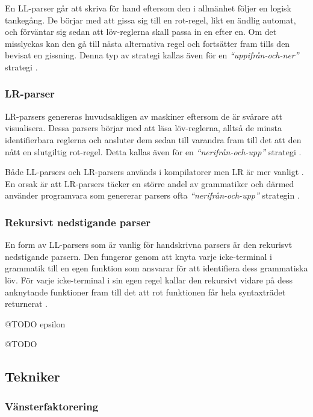 En LL-parser går att skriva för hand eftersom den i allmänhet följer en logisk
tankegång. De börjar med att gissa sig till en rot-regel, likt en ändlig
automat, och förväntar sig sedan att löv-reglerna skall passa in en efter en.
Om det misslyckas kan den gå till nästa alternativa regel och fortsätter
fram tills den bevisat en gissning. Denna typ av strategi kallas även för en
\textit{``uppifrån-och-ner''} strategi \citep[s. 67]{sm09}.

\subsubsection{LR-parser}

LR-parsers genereras huvudsakligen av maskiner eftersom de är svårare att
visualisera. Dessa parsers börjar med att läsa löv-reglerna, alltså de minsta
identifierbara reglerna och ansluter dem sedan till varandra fram till det att
den nått en slutgiltig rot-regel. Detta kallas även för en
\textit{``nerifrån-och-upp''} strategi \citep[s. 67]{sm09}.

Både LL-parsers och LR-parsers används i kompilatorer men LR är mer
vanligt \citep[s. 67]{sm09}. En orsak är att LR-parsers täcker en
större andel av grammatiker och därmed använder programvara som genererar
parsers ofta \textit{``nerifrån-och-upp''} strategin \citep[s. 61]{aa06}.

\subsubsection{Rekursivt nedstigande parser}

En form av LL-parsers som är vanlig för handskrivna parsers är den rekurisvt
nedstigande parsern. Den fungerar genom att knyta varje icke-terminal i
grammatik till en egen funktion som ansvarar för att identifiera dess
grammatiska löv. För varje icke-terminal i sin egen regel kallar den rekursivt
vidare på dess anknytande funktioner fram till det att rot funktionen får hela
syntaxträdet returnerat \citep[s. 24]{pt10}.

@TODO epsilon

@TODO

\subsection{Tekniker}



\subsubsection{Vänsterfaktorering}

